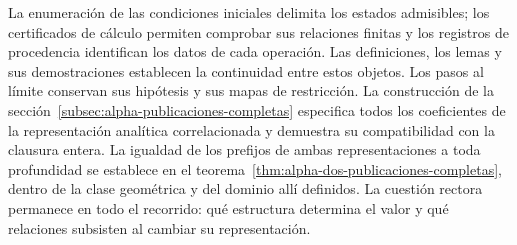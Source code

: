 La enumeración de las condiciones iniciales delimita los estados admisibles;
los certificados de cálculo permiten comprobar sus relaciones finitas y
los registros de procedencia identifican los datos de cada operación.
Las definiciones, los lemas y sus demostraciones establecen la continuidad
entre estos objetos. Los pasos al límite conservan sus hipótesis y sus
mapas de restricción.
La construcción de la sección~\ref{subsec:alpha-publicaciones-completas}
especifica todos los coeficientes de la representación analítica correlacionada
y demuestra su compatibilidad con la clausura entera. La igualdad de los
prefijos de ambas representaciones a toda profundidad se establece en el
teorema~\ref{thm:alpha-dos-publicaciones-completas}, dentro de la clase
geométrica y del dominio allí definidos.
La cuestión rectora permanece en todo
el recorrido: qué estructura determina el valor y qué relaciones subsisten
al cambiar su representación.
